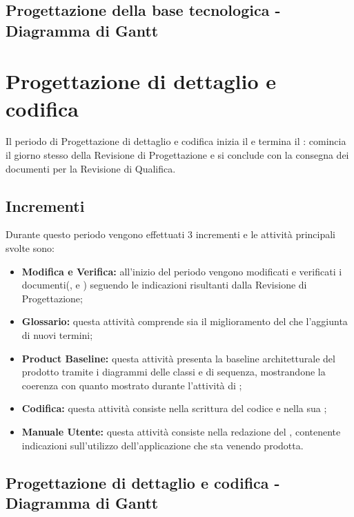 \documentclass[PianoDiProgetto.tex]{subfiles}
\begin{document}
\begin{landscape}
	\subsection{Progettazione della base tecnologica - Diagramma di Gantt}
\end{landscape}


\section{Progettazione di dettaglio e codifica}
Il periodo di Progettazione di dettaglio e codifica inizia il  e termina il : comincia il giorno stesso della Revisione di Progettazione e si conclude con la consegna dei documenti per la Revisione di Qualifica.

\subsection{Incrementi}
Durante questo periodo vengono effettuati 3 incrementi e le attività principali svolte sono:
\begin{itemize}
	\item \textbf{Modifica e Verifica:} all'inizio del periodo vengono modificati e verificati i documenti(\ndp, \pdp e \pdq) seguendo le indicazioni risultanti dalla Revisione di Progettazione;
	\item \textbf{Glossario:} questa attività comprende sia il miglioramento del \g che l'aggiunta di nuovi termini;
	\item \textbf{Product Baseline:} questa attività presenta la baseline architetturale del prodotto tramite i diagrammi delle classi e di sequenza, mostrandone la coerenza con quanto mostrato durante l'attività di \tb;
	\item \textbf{Codifica:} questa attività consiste nella scrittura del codice e nella sua ;
	\item \textbf{Manuale Utente:} questa attività consiste nella redazione del \mut, contenente indicazioni sull'utilizzo dell'applicazione che sta venendo prodotta.

\end{itemize}
\begin{landscape}
		\subsection{Progettazione di dettaglio e codifica - Diagramma di Gantt}
\end{landscape}
\end{document}
